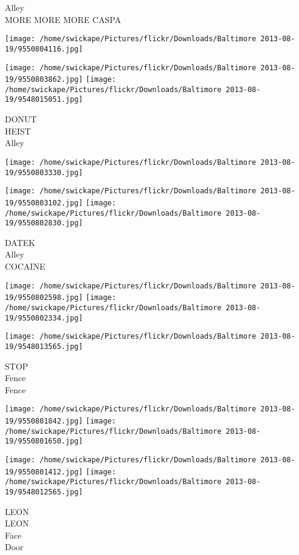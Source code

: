 \documentclass[10pt,letterpaper]{article}
\begin{document}
Alley\\
MORE MORE MORE CASPA
\pagebreak

\texttt{[image: /home/swickape/Pictures/flickr/Downloads/Baltimore 2013-08-19/9550804116.jpg]}

\vspace{0.25in}
\texttt{[image: /home/swickape/Pictures/flickr/Downloads/Baltimore 2013-08-19/9550803862.jpg]}
\texttt{[image: /home/swickape/Pictures/flickr/Downloads/Baltimore 2013-08-19/9548015051.jpg]}

DONUT\\
HEIST\\
Alley
\pagebreak

\texttt{[image: /home/swickape/Pictures/flickr/Downloads/Baltimore 2013-08-19/9550803330.jpg]}

\vspace{0.25in}
\texttt{[image: /home/swickape/Pictures/flickr/Downloads/Baltimore 2013-08-19/9550803102.jpg]}
\texttt{[image: /home/swickape/Pictures/flickr/Downloads/Baltimore 2013-08-19/9550802830.jpg]}

DATEK\\
Alley\\
COCAINE
\pagebreak

\texttt{[image: /home/swickape/Pictures/flickr/Downloads/Baltimore 2013-08-19/9550802598.jpg]}
\texttt{[image: /home/swickape/Pictures/flickr/Downloads/Baltimore 2013-08-19/9550802334.jpg]}

\vspace{0.25in}
\texttt{[image: /home/swickape/Pictures/flickr/Downloads/Baltimore 2013-08-19/9548013565.jpg]}

STOP\\
Fence\\
Fence
\pagebreak

\texttt{[image: /home/swickape/Pictures/flickr/Downloads/Baltimore 2013-08-19/9550801842.jpg]}
\texttt{[image: /home/swickape/Pictures/flickr/Downloads/Baltimore 2013-08-19/9550801650.jpg]}

\texttt{[image: /home/swickape/Pictures/flickr/Downloads/Baltimore 2013-08-19/9550801412.jpg]}
\texttt{[image: /home/swickape/Pictures/flickr/Downloads/Baltimore 2013-08-19/9548012565.jpg]}

LEON\\
LEON\\
Face\\
Door
\pagebreak
\end{document}
